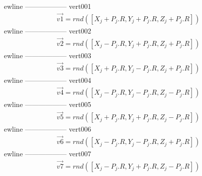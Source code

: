 ewline
------------------
\newline
vert001\newline
\begin{equation*}
 \begin{split}
 \vec{v1}=rnd([X_j+P_j.R,Y_j+P_j.R,Z_j+P_j.R])\end{split}
 \end{equation*}
ewline
------------------
\newline
vert002\newline
\begin{equation*}
 \begin{split}
 \vec{v2}=rnd([X_j-P_j.R,Y_j+P_j.R,Z_j+P_j.R])\end{split}
 \end{equation*}
ewline
------------------
\newline
vert003\newline
\begin{equation*}
 \begin{split}
 \vec{v3}=rnd([X_j+P_j.R,Y_j-P_j.R,Z_j+P_j.R])\end{split}
 \end{equation*}
ewline
------------------
\newline
vert004\newline
\begin{equation*}
 \begin{split}
 \vec{v4}=rnd([X_j-P_j.R,Y_j-P_j.R,Z_j-P_j.R])\end{split}
 \end{equation*}
ewline
------------------
\newline
vert005\newline
\begin{equation*}
 \begin{split}
 \vec{v5}=rnd([X_j+P_j.R,Y_j+P_j.R,Z_j-P_j.R])\end{split}
 \end{equation*}
ewline
------------------
\newline
vert006\newline
\begin{equation*}
 \begin{split}
 \vec{v6}=rnd([X_j-P_j.R,Y_j-P_j.R,Z_j+P_j.R])\end{split}
 \end{equation*}
ewline
------------------
\newline
vert007\newline
\begin{equation*}
 \begin{split}
 \vec{v7}=rnd([X_j-P_j.R,Y_j+P_j.R,Z_j-P_j.R])\end{split}
 \end{equation*}
